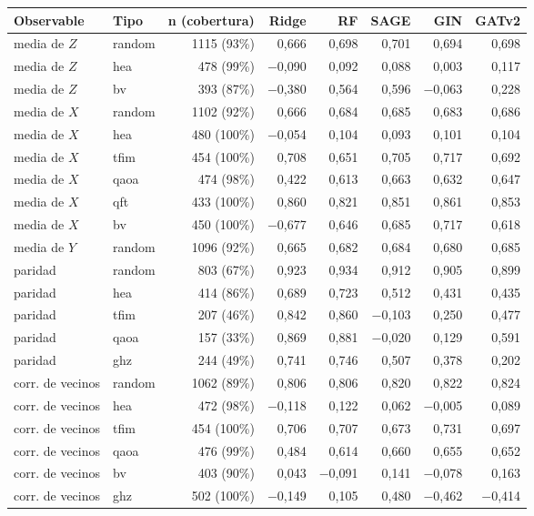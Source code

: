 \begin{table}[htbp]
    \centering
    {\footnotesize
    \begin{tabular}{@{}llrrrrrr@{}}
        \toprule
        \textbf{Observable} & \textbf{Tipo} & \textbf{n (cobertura)} & \textbf{Ridge} & \textbf{RF} & \textbf{SAGE} & \textbf{GIN} & \textbf{GATv2} \\
        \midrule
        media de $Z$ & random & 1115 (93\%) & 0,666 & 0,698 & 0,701 & 0,694 & 0,698 \\
        media de $Z$ & hea & 478 (99\%) & $-$0,090 & 0,092 & 0,088 & 0,003 & 0,117 \\
        media de $Z$ & bv & 393 (87\%) & $-$0,380 & 0,564 & 0,596 & $-$0,063 & 0,228 \\
        media de $X$ & random & 1102 (92\%) & 0,666 & 0,684 & 0,685 & 0,683 & 0,686 \\
        media de $X$ & hea & 480 (100\%) & $-$0,054 & 0,104 & 0,093 & 0,101 & 0,104 \\
        media de $X$ & tfim & 454 (100\%) & 0,708 & 0,651 & 0,705 & 0,717 & 0,692 \\
        media de $X$ & qaoa & 474 (98\%) & 0,422 & 0,613 & 0,663 & 0,632 & 0,647 \\
        media de $X$ & qft & 433 (100\%) & 0,860 & 0,821 & 0,851 & 0,861 & 0,853 \\
        media de $X$ & bv & 450 (100\%) & $-$0,677 & 0,646 & 0,685 & 0,717 & 0,618 \\
        media de $Y$ & random & 1096 (92\%) & 0,665 & 0,682 & 0,684 & 0,680 & 0,685 \\
        paridad & random & 803 (67\%) & 0,923 & 0,934 & 0,912 & 0,905 & 0,899 \\
        paridad & hea & 414 (86\%) & 0,689 & 0,723 & 0,512 & 0,431 & 0,435 \\
        paridad & tfim & 207 (46\%) & 0,842 & 0,860 & $-$0,103 & 0,250 & 0,477 \\
        paridad & qaoa & 157 (33\%) & 0,869 & 0,881 & $-$0,020 & 0,129 & 0,591 \\
        paridad & ghz & 244 (49\%) & 0,741 & 0,746 & 0,507 & 0,378 & 0,202 \\
        corr. de vecinos & random & 1062 (89\%) & 0,806 & 0,806 & 0,820 & 0,822 & 0,824 \\
        corr. de vecinos & hea & 472 (98\%) & $-$0,118 & 0,122 & 0,062 & $-$0,005 & 0,089 \\
        corr. de vecinos & tfim & 454 (100\%) & 0,706 & 0,707 & 0,673 & 0,731 & 0,697 \\
        corr. de vecinos & qaoa & 476 (99\%) & 0,484 & 0,614 & 0,660 & 0,655 & 0,652 \\
        corr. de vecinos & bv & 403 (90\%) & 0,043 & $-$0,091 & 0,141 & $-$0,078 & 0,163 \\
        corr. de vecinos & ghz & 502 (100\%) & $-$0,149 & 0,105 & 0,480 & $-$0,462 & $-$0,414 \\
        \bottomrule
    \end{tabular}}


\end{table}
